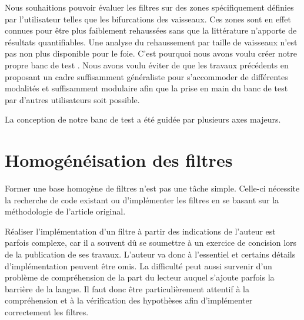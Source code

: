 Nous souhaitions pouvoir évaluer les filtres sur des zones spécifiquement définies par l'utilisateur telles que les bifurcations des vaisseaux. Ces zones sont en effet connues pour être plus faiblement rehaussées sans que la littérature n'apporte de résultats quantifiables. Une analyse du rehaussement par taille de vaisseaux n'est pas non plus disponible pour le foie. C'est pourquoi nous avons voulu créer notre propre banc de test . Nous avons voulu éviter de  que les travaux précédents en proposant un cadre suffisamment généraliste pour s'accommoder de différentes modalités et suffisamment modulaire afin que la prise en main du banc de test par d'autres utilisateurs soit possible.

La conception de notre banc de test a été guidée par plusieurs axes majeurs.
  
\section{Homogénéisation des filtres}
\label{sec:Filtres}
Former une base homogène de filtres n'est pas une tâche simple. Celle-ci nécessite la recherche de code existant ou d'implémenter les filtres en se basant sur la méthodologie de l'article original.

Réaliser l'implémentation d'un filtre à partir des indications de l'auteur est parfois complexe, car il a souvent dû se soumettre à un exercice de concision lors de la publication de ses travaux. L'auteur va donc à l'essentiel et certains détails d'implémentation peuvent être omis. La difficulté peut aussi survenir d'un problème de compréhension de la part du lecteur auquel s'ajoute parfois la barrière de la langue. Il faut donc être particulièrement attentif à la compréhension et à la vérification des hypothèses afin d'implémenter correctement les filtres. 

